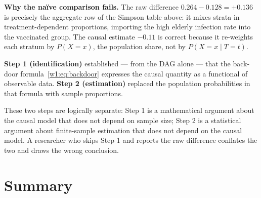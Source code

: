 \documentclass[master.tex]{subfiles}
\begin{document}
\medskip
\noindent\textbf{Why the na\"{i}ve comparison fails.}
The raw difference $0.264 - 0.128 = +0.136$ is precisely the aggregate
row of the Simpson table above: it mixes strata in treatment-dependent
proportions, importing the high elderly infection rate into the vaccinated
group.  The causal estimate $-0.11$ is correct because it re-weights each
stratum by $P(X{=}x)$, the population share, not by $P(X{=}x \mid T{=}t)$.

\begin{tcolorbox}[defstyle, title={The Two Steps, Concretely}]
\textbf{Step 1 (identification)} established --- from the DAG alone --- that
the back-door formula~\eqref{w1:eq:backdoor} expresses the causal quantity as
a functional of observable data.
\textbf{Step 2 (estimation)} replaced the population probabilities in that
formula with sample proportions.

These two steps are logically separate: Step 1 is a mathematical argument
about the causal model that does not depend on sample size; Step 2 is a
statistical argument about finite-sample estimation that does not depend on
the causal model.  A researcher who skips Step 1 and reports the raw
difference conflates the two and draws the wrong conclusion.
\end{tcolorbox}

\section{Summary}
\end{document}
